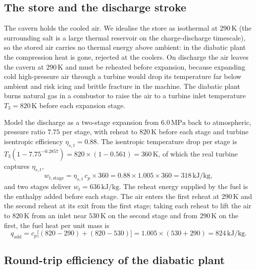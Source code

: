 \subsection{The store and the discharge stroke}

The cavern holds the cooled air. We idealise the store as isothermal at
$290\,\si{\kelvin}$ (the surrounding salt is a large thermal reservoir on
the charge-discharge timescale), so the stored air carries no thermal
energy above ambient: in the diabatic plant the compression heat is gone,
rejected at the coolers. On discharge the air leaves the cavern at
$290\,\si{\kelvin}$ and must be reheated before expansion, because
expanding cold high-pressure air through a turbine would drop its
temperature far below ambient and risk icing and brittle fracture in the
machine. The diabatic plant burns natural gas in a combustor to raise the
air to a turbine inlet temperature $T_3 = 820\,\si{\kelvin}$ before each
expansion stage.

Model the discharge as a two-stage expansion from $6.0\,\text{MPa}$ back
to atmospheric, pressure ratio $7.75$ per stage, with reheat to
$820\,\si{\kelvin}$ before each stage and turbine isentropic efficiency
$\eta_{s,t} = 0.88$. The isentropic temperature drop per stage is
$T_3(1 - 7.75^{-0.2857}) = 820 \times (1 - 0.561) = 360\,\si{\kelvin}$,
of which the real turbine captures $\eta_{s,t}$,
\[
w_{t,\text{stage}} = \eta_{s,t}\,c_p \times 360
  = 0.88 \times 1.005 \times 360 = 318\,\text{kJ}/\text{kg},
\]
and two stages deliver $w_t = 636\,\text{kJ}/\text{kg}$. The reheat
energy supplied by the fuel is the enthalpy added before each stage. The
air enters the first reheat at $290\,\si{\kelvin}$ and the second reheat
at its exit from the first stage; taking each reheat to lift the air to
$820\,\si{\kelvin}$ from an inlet near $530\,\si{\kelvin}$ on the second
stage and from $290\,\si{\kelvin}$ on the first, the fuel heat per unit
mass is
\[
q_{\text{add}} = c_p\big[(820 - 290) + (820 - 530)\big]
  = 1.005 \times (530 + 290) = 824\,\text{kJ}/\text{kg}.
\]

\subsection{Round-trip efficiency of the diabatic plant}

